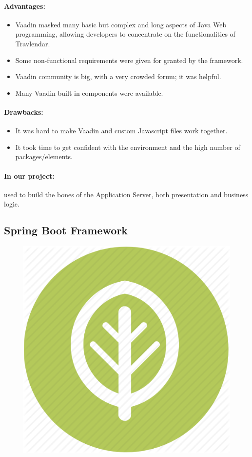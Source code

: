\documentclass{article}
\begin{document}
			\paragraph{Advantages:}
			\begin{itemize}
				\item{}Vaadin masked many basic but complex and long aspects of Java Web programming, allowing developers to concentrate on the functionalities of Travlendar.
				\item{}Some non-functional requirements were given for granted by the framework. 
				\item{}Vaadin community is big, with a very crowded forum; it was helpful.
				\item{}Many Vaadin built-in components were available.
			\end{itemize}
			\paragraph{Drawbacks:}
			\begin{itemize}
				\item{}It was hard to make Vaadin and custom Javascript files work together.
				\item{}It took time to get confident with the environment and the high number of packages/elements.
			\end{itemize}
			\paragraph{In our project:} used to build the bones of the Application Server, both presentation and business logic.
	\subsection{Spring Boot Framework}
			\begin{figure}[H]
			\begin{center}
			\includegraphics[width=.2\linewidth]{Images/Appendix/spring1.png}
			\label{fig:S1}
			\end{center}
			\end{figure}
\end{document}
